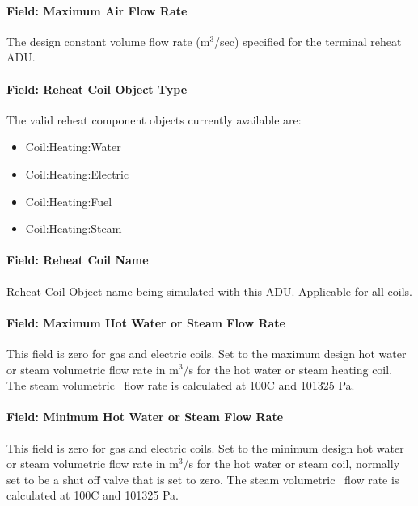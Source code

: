 \paragraph{Field: Maximum Air Flow Rate}\label{field-maximum-air-flow-rate-1}

The design constant volume flow rate (m\(^{3}\)/sec) specified for the terminal reheat ADU.

\paragraph{Field: Reheat Coil Object Type}\label{field-reheat-coil-object-type}

The valid reheat component objects currently available are:

\begin{itemize}
\item
  Coil:Heating:Water
\item
  Coil:Heating:Electric
\item
  Coil:Heating:Fuel
\item
  Coil:Heating:Steam
\end{itemize}

\paragraph{Field: Reheat Coil Name}\label{field-reheat-coil-name}

Reheat Coil Object name being simulated with this ADU. Applicable for all coils.

\paragraph{Field: Maximum Hot Water or Steam Flow Rate}\label{field-maximum-hot-water-or-steam-flow-rate}

This field is zero for gas and electric coils. Set to the maximum design hot water or steam volumetric flow rate in m\(^{3}\)/s for the hot water or steam heating coil. The steam volumetric~ flow rate is calculated at 100C and 101325 Pa.

\paragraph{Field: Minimum Hot Water or Steam Flow Rate}\label{field-minimum-hot-water-or-steam-flow-rate}

This field is zero for gas and electric coils. Set to the minimum design hot water or steam volumetric flow rate in m\(^{3}\)/s for the hot water or steam coil, normally set to be a shut off valve that is set to zero. The steam volumetric~ flow rate is calculated at 100C and 101325 Pa.

